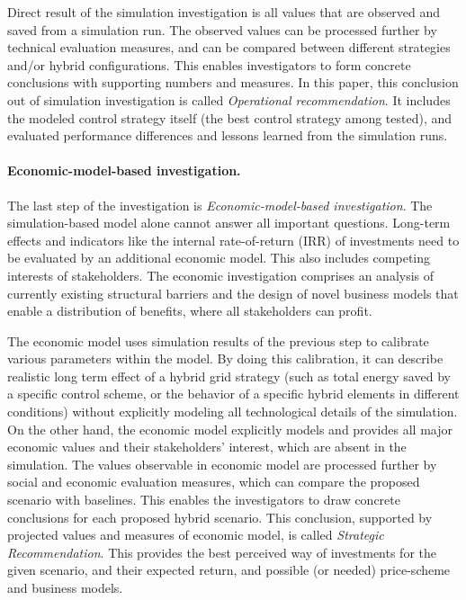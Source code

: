 \documentclass[review]{elsarticle}
\begin{document}
Direct result of the simulation investigation is all values that 
are observed and saved from a simulation run. The observed values can
be processed further by technical evaluation measures, and can be
compared between different strategies and/or hybrid configurations. 
This enables investigators to form concrete conclusions with
supporting numbers and measures. In this paper, this conclusion out of
simulation investigation is called {\em Operational recommendation}. 
It includes the modeled control strategy itself (the best control
strategy among tested), and evaluated performance differences and
lessons learned from the simulation runs. 

\paragraph{Economic-model-based investigation.}
\noindent
The last step of the investigation is {\em Economic-model-based 
  investigation}. 
The simulation-based model alone cannot answer all important
questions. Long-term effects and indicators like the internal
rate-of-return (IRR) of investments need to be evaluated by an
additional economic model.   
This also includes competing interests of stakeholders. 
The economic investigation comprises an analysis of currently existing
structural barriers and the design of novel business models that
enable a distribution of benefits, where all stakeholders can profit.  

The economic model uses simulation results of the previous step
to calibrate various parameters within the model. 
By doing this calibration, it can describe realistic long term effect
of a hybrid grid strategy (such as total energy saved by a specific
control scheme, or the behavior of a specific hybrid elements in
different conditions) without explicitly modeling all technological
details of the simulation. 
On the other hand, the economic model explicitly models and provides
all major economic values and their stakeholders' interest, which are  
absent in the simulation. The values observable in economic model are
processed further by social and economic evaluation measures, which
can compare the proposed scenario with baselines. 
This enables the investigators to draw concrete conclusions for each 
proposed hybrid scenario. This conclusion, supported by projected
values and measures of economic model, is called {\em Strategic
Recommendation}. 
This provides the best perceived way of investments for the given
scenario, and their expected return, and possible (or needed)
price-scheme and business models.    
\end{document}
